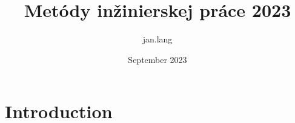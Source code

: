 \documentclass{article}
\title{Metódy inžinierskej práce 2023}
\author{jan.lang }
\date{September 2023}
\begin{document}
\maketitle

\section{Introduction}
\end{document}
